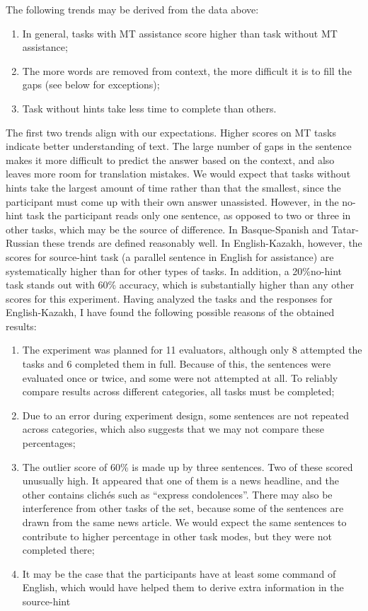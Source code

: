 \documentclass[11pt]{article}
\begin{document}
The following trends may be derived from the data above:
\begin{enumerate}
\item  In general, tasks with MT assistance score higher than task without MT
assistance;
\item  The more words are removed from context, the more difficult it is to fill the gaps
(see below for exceptions);
\item  Task without hints take less time to complete than others.
\end{enumerate}
The first two trends align with our expectations. Higher scores on MT tasks indicate
better understanding of text. The large number of gaps in the sentence makes it more
difficult to predict the answer based on the context, and also leaves more room for
translation mistakes. We would expect that tasks without hints take the largest amount of
time rather than that the smallest, since the participant must come up with their own
answer unassisted. However, in the no-hint task the participant reads only one sentence,
as opposed to two or three in other tasks, which may be the source of difference.
In Basque-Spanish and Tatar-Russian these trends are defined reasonably well. In
English-Kazakh, however, the scores for source-hint task (a parallel sentence in English
for assistance) are systematically higher than for other types of tasks. In addition, a 20\%no-hint task stands out with 60\% accuracy, which is substantially higher than any other
scores for this experiment.
Having analyzed the tasks and the responses for English-Kazakh, I have found the
following possible reasons of the obtained results:
\begin{enumerate}
\item  The experiment was planned for 11 evaluators, although only 8 attempted the
tasks and 6 completed them in full. Because of this, the sentences were evaluated
once or twice, and some were not attempted at all. To reliably compare results
across different categories, all tasks must be completed;
\item  Due to an error during experiment design, some sentences are not repeated across
categories, which also suggests that we may not compare these percentages;
\item  The outlier score of 60\% is made up by three sentences. Two of these scored
unusually high. It appeared that one of them is a news headline, and the other
contains clich\'es such as ``express condolences''. There may also be interference
from other tasks of the set, because some of the sentences are drawn from the
same news article. We would expect the same sentences to contribute to higher
percentage in other task modes, but they were not completed there;
\item  It may be the case that the participants have at least some command of English,
which would have helped them to derive extra information in the source-hint
\end{enumerate}
\end{document}
